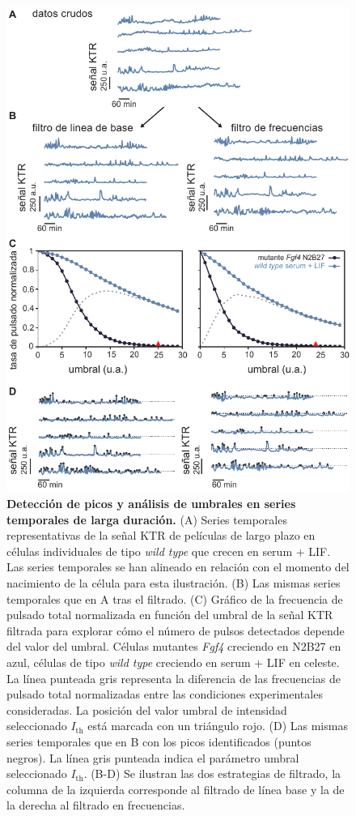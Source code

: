 \documentclass[./main.tex]{subfiles}
\begin{document}
\begin{figure}
    \centering
    \includegraphics[width=1\columnwidth]{figures/chapter4/C4_pulse_detection.pdf}
    \caption{\textbf{Detección de picos y análisis de umbrales en series temporales de larga duración.} (A) Series temporales representativas de la señal KTR de películas de largo plazo en células individuales de tipo \textit{wild type} que crecen en serum + LIF. Las series temporales se han alineado en relación con el momento del nacimiento de la célula para esta ilustración. (B) Las mismas series temporales que en A tras el filtrado. (C) Gráfico de la frecuencia de pulsado total normalizada en función del umbral de la señal KTR filtrada para explorar cómo el número de pulsos detectados depende del valor del umbral. Células mutantes \textit{Fgf4} creciendo en N2B27 en azul, células de tipo \textit{wild type} creciendo en serum + LIF en celeste. La línea punteada gris representa la diferencia de las frecuencias de pulsado total normalizadas entre las condiciones experimentales consideradas. La posición del valor umbral de intensidad seleccionado $I_{\text{th}}$ está marcada con un triángulo rojo. (D) Las mismas series temporales que en B con los picos identificados (puntos negros). La línea gris punteada indica el parámetro umbral seleccionado $I_{\text{th}}$. (B-D) Se ilustran las dos estrategias de filtrado, la columna de la izquierda corresponde al filtrado de línea base y la de la derecha al filtrado en frecuencias.}
    \label{C4_fig:pulse_detection}
\end{figure}
\end{document}
